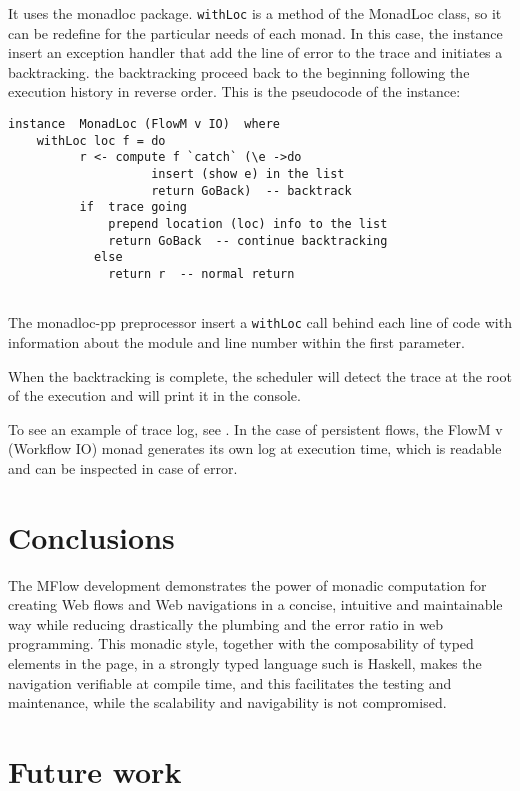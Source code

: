 \documentclass{tmr}
\begin{document}
It uses the monadloc\cite{auth:monadloc} package. {\tt withLoc} is a method of the MonadLoc class, so it can be redefine for the particular needs of each monad. In this case, the instance insert an exception handler that add the line of error to the trace and initiates a backtracking. the backtracking proceed back to the beginning following the execution history in reverse order.  This is the pseudocode of the instance: 
 
{\tt

\begin{verbatim}
instance  MonadLoc (FlowM v IO)  where 
    withLoc loc f = do 
          r <- compute f `catch` (\e ->do 
                    insert (show e) in the list 
                    return GoBack)  -- backtrack 
          if  trace going 
              prepend location (loc) info to the list 
              return GoBack  -- continue backtracking 
            else 
              return r  -- normal return 
 
 \end{verbatim}
 
 }
 
The monadloc-pp preprocessor insert a {\tt withLoc} call behind each line of code with information about the module and line number within the first parameter. 

When the backtracking is complete, the scheduler will detect the trace at the root of the execution and will print it in the console.
 
To see an example of trace log, see \cite{auth:trace}. In the case of persistent flows, the FlowM v (Workflow IO) monad generates its own log at execution time, which is readable and can be inspected in case of error. 
 
\section{Conclusions} 
 
The MFlow development demonstrates the power of monadic computation for creating Web flows and Web navigations in a concise, intuitive and maintainable way while reducing drastically the plumbing and the error ratio in web programming. This monadic style, together with the composability of typed elements in the page, in a strongly typed language such is Haskell, makes the navigation verifiable at compile time, and this facilitates the testing and maintenance, while the scalability and navigability is not compromised.  
  
\section{Future work}  
  
\end{document}
